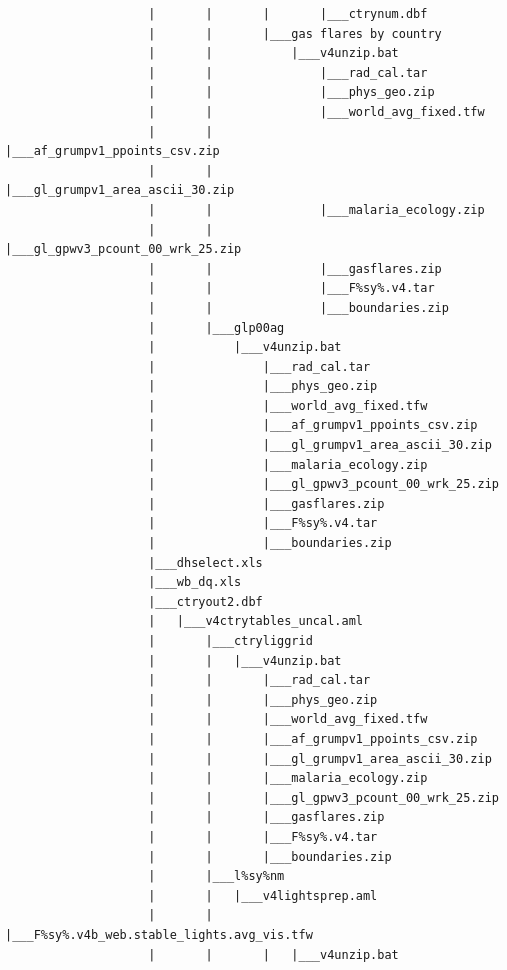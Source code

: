 \documentclass[
]{book}
\begin{document}
\begin{verbatim}
                    |       |       |       |___ctrynum.dbf
                    |       |       |___gas flares by country
                    |       |           |___v4unzip.bat
                    |       |               |___rad_cal.tar
                    |       |               |___phys_geo.zip
                    |       |               |___world_avg_fixed.tfw
                    |       |               |___af_grumpv1_ppoints_csv.zip
                    |       |               |___gl_grumpv1_area_ascii_30.zip
                    |       |               |___malaria_ecology.zip
                    |       |               |___gl_gpwv3_pcount_00_wrk_25.zip
                    |       |               |___gasflares.zip
                    |       |               |___F%sy%.v4.tar
                    |       |               |___boundaries.zip
                    |       |___glp00ag
                    |           |___v4unzip.bat
                    |               |___rad_cal.tar
                    |               |___phys_geo.zip
                    |               |___world_avg_fixed.tfw
                    |               |___af_grumpv1_ppoints_csv.zip
                    |               |___gl_grumpv1_area_ascii_30.zip
                    |               |___malaria_ecology.zip
                    |               |___gl_gpwv3_pcount_00_wrk_25.zip
                    |               |___gasflares.zip
                    |               |___F%sy%.v4.tar
                    |               |___boundaries.zip
                    |___dhselect.xls
                    |___wb_dq.xls
                    |___ctryout2.dbf
                    |   |___v4ctrytables_uncal.aml
                    |       |___ctryliggrid
                    |       |   |___v4unzip.bat
                    |       |       |___rad_cal.tar
                    |       |       |___phys_geo.zip
                    |       |       |___world_avg_fixed.tfw
                    |       |       |___af_grumpv1_ppoints_csv.zip
                    |       |       |___gl_grumpv1_area_ascii_30.zip
                    |       |       |___malaria_ecology.zip
                    |       |       |___gl_gpwv3_pcount_00_wrk_25.zip
                    |       |       |___gasflares.zip
                    |       |       |___F%sy%.v4.tar
                    |       |       |___boundaries.zip
                    |       |___l%sy%nm
                    |       |   |___v4lightsprep.aml
                    |       |       |___F%sy%.v4b_web.stable_lights.avg_vis.tfw
                    |       |       |   |___v4unzip.bat

\end{verbatim}
\end{document}
